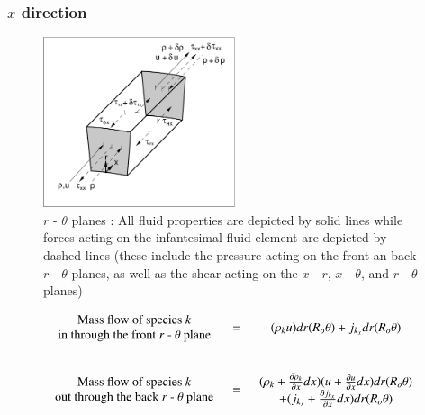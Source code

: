 \subsubsection{$x$ direction}

\begin{figure}[ht]
\includegraphics[height=5cm]{./xdir.eps}
\caption[$r$ - $\theta$ planes]{$r$ - $\theta$ planes : All fluid properties are depicted by solid lines while 
				forces acting on the infantesimal fluid element are depicted by dashed lines (these include
				the pressure acting on the front an back $r$ - $\theta$ planes, as well as the shear
				acting on the $x$ - $r$, $x$ - $\theta$, and $r$ - $\theta$ planes)}
\label{fig:xdir}
\end{figure}

\begin{displaymath}
	\begin{array}{ccc}
		\begin{array}{c}
			\textrm{Mass flow of species \emph{k}} \\ \textrm{in through the front $r$ - $\theta$ plane} 
		\end{array} & 
	= & (\rho_k u)dr(R_o \theta) + j_{k_x} dr(R_o \theta)\\
	& \\ & \\
		\begin{array}{c}
			\textrm{Mass flow of species \emph{k}} \\ \textrm{out through the back $r$ - $\theta$ plane}
		\end{array} & 
	= & \begin{array}{c}
		(\rho_k + \frac{\partial \rho_k}{\partial x}dx)(u + \frac{\partial u}{\partial x}dx)dr(R_o \theta) \\
	+ (j_{k_x} + \frac{\partial j_{k_x}}{\partial x}dx)dr(R_o \theta)
		\end{array}
	\end{array}
\end{displaymath}

